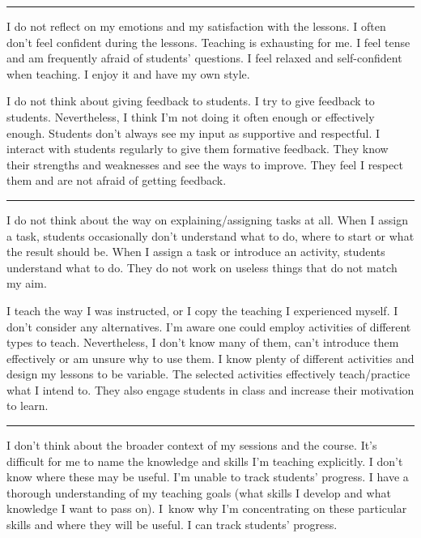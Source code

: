 \rule{\textwidth}{0.4pt}
{I do not reflect on my emotions and my satisfaction with the lessons.}
{I often don't feel confident during the lessons. Teaching is exhausting for me. I feel tense and am frequently afraid of students' questions.}
{I feel relaxed and self-confident when teaching. I enjoy it and have my own style.}

\newpage
{}
{I do not think about giving feedback to students.}
{I try to give feedback to students. Nevertheless, I think I'm not doing it often enough or effectively enough. Students don't always see my input as supportive and respectful.}
{I interact with students regularly to give them formative feedback. They know their strengths and weaknesses and see the ways to improve. They feel I respect them and are not afraid of getting feedback.}

\rule{\textwidth}{0.4pt}
{I do not think about the way on explaining/assigning tasks at all.}
{When I assign a task, students occasionally don't understand what to do, where to start or what the result should be.}
{When I assign a task or introduce an activity, students understand what to do. They do not work on useless things that do not match my aim.}

\newpage
{}
{I teach the way I was instructed, or I copy the teaching I experienced myself. I don't consider any alternatives.}
{I'm aware one could employ activities of different types to teach. Nevertheless, I don't know many of them, can't introduce them effectively or am unsure why to use them.}
{I know plenty of different activities and design my lessons to be variable. The selected activities effectively teach/practice what I intend to. They also engage students in class and increase their motivation to learn.}

\rule{\textwidth}{0.4pt}
{I don't think about the broader context of my sessions and the course.}
{It's difficult for me to name the knowledge and skills I'm teaching explicitly. I don't know where these may be useful. I'm unable to track students' progress.}
{I have a thorough understanding of my teaching goals (what skills I develop and what knowledge I want to pass on). I~know why I'm concentrating on these particular skills and where they will be useful. I can track students' progress.}
\vspace*{-1em}

